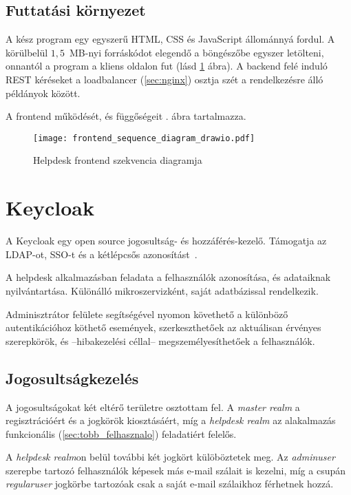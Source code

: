 \subsection{Futtatási környezet}
A kész program egy egyszerű HTML, CSS és JavaScript állománnyá fordul. A körülbelül $1,5$~MB-nyi forráskódot elegendő a böngészőbe egyszer letölteni, onnantól a program a kliens oldalon fut (lásd \ref{fig:frontend_sequence_diagram} ábra). A backend felé induló REST kéréseket a loadbalancer (\ref{sec:nginx}) osztja szét a rendelkezésre álló példányok között.

A frontend működését, és függőségeit . ábra tartalmazza.

\begin{figure}[hbp] 
	\centering
	\texttt{[image: frontend\_sequence\_diagram\_drawio.pdf]}
	\caption{Helpdesk frontend szekvencia diagramja}
	\label{fig:frontend_sequence_diagram}
\end{figure}


\section{Keycloak}\label{sec:keycloak}
A Keycloak egy open source jogosultság- és hozzáférés-kezelő. Támogatja az LDAP-ot, SSO-t és a kétlépcsős azonosítást~\cite{Keycloak_website}. 

A helpdesk alkalmazásban feladata a felhasználók azonosítása, és adataiknak nyilvántartása. Különálló mikroszervizként, saját adatbázissal rendelkezik.

Adminisztrátor felülete segítségével nyomon követhető a különböző autentikációhoz köthető események, szerkeszthetőek az aktuálisan érvényes szerepkörök, és --hibakezelési céllal-- megszemélyesíthetőek a felhasználók.


\subsection{Jogosultságkezelés}
A jogosultságokat két eltérő területre osztottam fel. A \textit{master realm} a regisztrációért és a jogkörök kiosztásáért, míg a \textit{helpdesk realm} az alakalmazás funkcionális (\ref{sec:tobb_felhasznalo}) feladatiért felelős.

A \textit{helpdesk realm}on belül további két jogkört külöböztetek meg. Az \textit{admin\textunderscore user} szerepbe tartozó felhasználók képesek más e-mail szálait is kezelni, míg a csupán \textit{regular\textunderscore user} jogkörbe tartozóak csak a saját e-mail szálaikhoz férhetnek hozzá.


